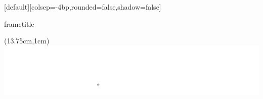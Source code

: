 

[default][colsep=-4bp,rounded=false,shadow=false]
{%
    \nointerlineskip%
    \begin{beamercolorbox}[wd=\paperwidth,ht=3.5ex,dp=0.6ex]{frametitle}
        \hspace*{1.3ex}\insertframetitle%
        
        \hspace*{1.3ex}\small\insertframesubtitle%
    \end{beamercolorbox}%
    \begin{textblock*}{100mm}(13.75cm,1cm)
        \includegraphics[height=.4cm,keepaspectratio]{graph/Logo_GTCMT_white}
    \end{textblock*}
}


